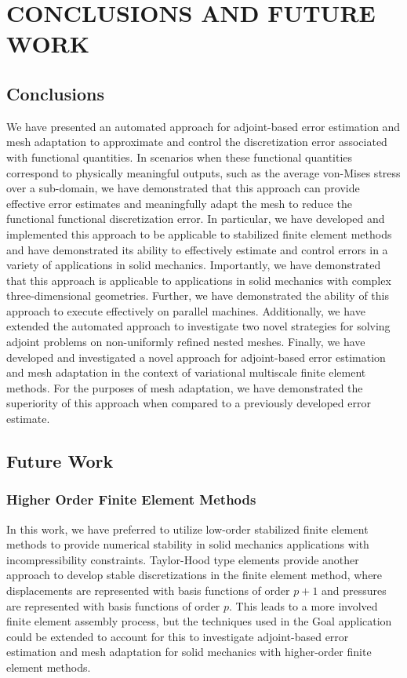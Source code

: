 \chapter{CONCLUSIONS AND FUTURE WORK}
\label{chap:conclusions}

\section{Conclusions}

We have presented an automated approach for adjoint-based error estimation and mesh
adaptation to approximate and control the discretization error associated with
functional quantities. In scenarios when these functional quantities correspond
to physically meaningful outputs, such as the average von-Mises stress over a
sub-domain, we have demonstrated that this approach can provide effective error
estimates and meaningfully adapt the mesh to reduce the functional functional
discretization error. In particular, we have developed and implemented this approach
to be applicable to stabilized finite element methods and have demonstrated its
ability to effectively estimate and control errors in a variety of applications
in solid mechanics. Importantly, we have demonstrated that this approach is applicable
to applications in solid mechanics with complex three-dimensional geometries.
Further, we have demonstrated the ability of this approach
to execute effectively on parallel machines. Additionally, we have extended the
automated approach to investigate two novel strategies for solving adjoint problems
on non-uniformly refined nested meshes. Finally, we have developed and
investigated a novel approach for adjoint-based error estimation and mesh adaptation
in the context of variational multiscale finite element methods. For the purposes
of mesh adaptation, we have demonstrated the superiority of this approach when compared
to a previously developed error estimate.

\section{Future Work}

\subsection{Higher Order Finite Element Methods}

In this work, we have preferred to utilize low-order stabilized
finite element methods to provide numerical stability in solid
mechanics applications with incompressibility constraints.
Taylor-Hood type elements provide another approach to develop
stable discretizations in the finite element method, where
displacements are represented with basis functions of order
$p+1$ and pressures are represented with basis functions of
order $p$. This leads to a more involved finite element assembly
process, but the techniques used in the Goal application
could be extended to account for this to investigate adjoint-based
error estimation and mesh adaptation for solid mechanics with
higher-order finite element methods.

